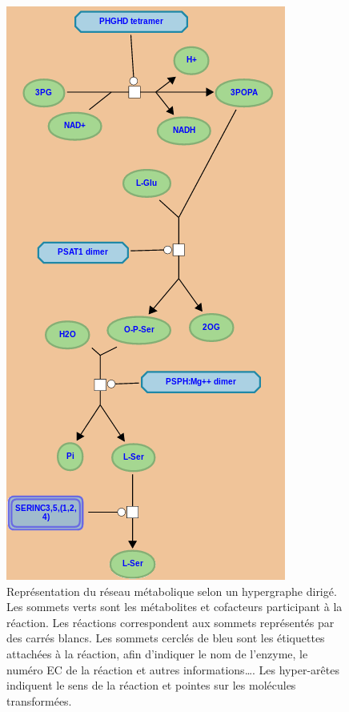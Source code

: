 \begin{refsegment}
\begin{shadedfigure}[H]
\begin{subfigure}[t]{.45\textwidth}
        \includegraphics[width=\textwidth]{img/reactome_homo_sapiens_serine_biosynthesis.png}
        \caption{ Représentation du réseau métabolique selon un hypergraphe dirigé. Les sommets verts sont les métabolites et cofacteurs participant à la réaction. Les réactions correspondent aux sommets représentés par des carrés blancs. Les sommets cerclés de bleu sont les étiquettes attachées à la réaction, afin d'indiquer le nom de l'enzyme, le numéro \acrfull{EC} de la réaction et autres informations\ldots. Les hyper-arêtes indiquent le sens de la réaction et pointes sur les molécules transformées. }
        \label{fig:reactome_serine}
    \end{subfigure}
    \end{shadedfigure}


\end{refsegment}

